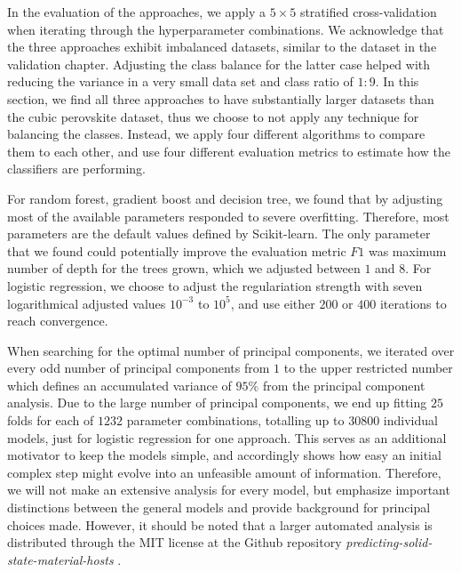 In the evaluation of the approaches, we apply a $5\times 5$ stratified cross-validation when iterating through the hyperparameter combinations. We acknowledge that the three approaches exhibit imbalanced datasets, similar to the dataset in the validation chapter. Adjusting the class balance for the latter case helped with reducing the variance in a very small data set and class ratio of $1:9$. In this section, we find all three approaches to have substantially larger datasets than the cubic perovskite dataset, thus we choose to not apply any technique for balancing the classes. Instead, we apply four different algorithms to compare them to each other, and use four different evaluation metrics to estimate how the classifiers are performing. %

For random forest, gradient boost and decision tree, we found that by adjusting most of the available parameters responded to severe overfitting. Therefore, most parameters are the default values defined by Scikit-learn. The only parameter that we found could potentially improve the evaluation metric $F1$ was maximum number of depth for the trees grown, which we adjusted between $1$ and $8$. For logistic regression, we choose to adjust the regulariation strength with seven logarithmical adjusted values $10^{-3}$ to $10^{5}$, and use either $200$ or $400$ iterations to reach convergence.

When searching for the optimal number of principal components, we iterated over every odd number of principal components from $1$ to the upper restricted number which defines an accumulated variance of $95\%$ from the principal component analysis. Due to the large number of principal components, we end up fitting $25$ folds for each of $1232$ parameter combinations, totalling up to $30800$ individual models, just for logistic regression for one approach. This serves as an additional motivator to keep the models simple, and accordingly shows how easy an initial complex step might evolve into an unfeasible amount of information. Therefore, we will not make an extensive analysis for every model, but emphasize important distinctions between the general models and provide background for principal choices made. However, it should be noted that a larger automated analysis is distributed through the MIT license at the Github repository \textit{predicting-solid-state-material-hosts} \cite{Ohebbi2021}.


